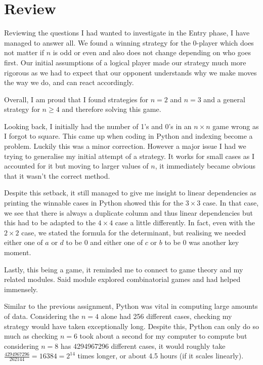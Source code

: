 \documentclass[11pt]{article}
\newcommand{\keywordfont}{\textsc}
\newcommand{\keyword}[1]{%
  \marginpar{\raggedright\small\keywordfont{#1}}}
\begin{document}
\section{Review}

Reviewing the \keyword{Check} questions I had wanted to investigate in the Entry phase, I have managed to answer all. We found a winning strategy for the 0-player which does not matter if $n$ is odd or even and also does not change depending on who goes first. Our initial assumptions of a logical player made our strategy much more rigorous as we had to expect that our opponent understands why we make moves the way we do, and can react accordingly. 

Overall, \keyword{Reflect} I am proud that I found strategies for $n=2$ and $n=3$ and a general strategy for $n \geq 4$ and therefore solving this game. 

Looking back, I initially  had the number of 1's and 0's in an $n \times n$ game wrong as I forgot to square. This came up when coding in Python and indexing become a problem. Luckily this was a minor correction. 
However a major issue I had we trying to generalise my initial attempt of a strategy. It works for small cases as I accounted for it but moving to larger values of $n$, it immediately became obvious that it wasn't the correct method. 

Despite this setback, it still managed to give me insight to linear dependencies as printing the winnable cases in Python showed this for the $3 \times 3$ case. In that case, we see that there is always a duplicate column and thus linear dependencies but this had to be adapted to the $4 \times 4$ case a little differently. In fact, even with the $2 \times 2$ case, we stated the formula for the determinant, but realising we needed either one of $a$ or $d$ to be 0 and either one of $c$ or $b$ to be 0 was another key moment. 

Lastly, this being a game, it reminded me to connect to game theory and my related modules. Said module explored combinatorial games and had helped immensely.

Similar to the previous assignment, Python \keyword{Reflect} was vital in computing large amounts of data. Considering the $n=4$ alone had 256 different cases, checking my strategy would have taken exceptionally long. Despite this, Python can only do so much as checking $n=6$ took about a second for my computer to compute but considering $n=8$ has 4294967296 different cases, it would roughly take $\frac{4294967296}{262144} = 16384 = 2^{14}$ times longer, or about 4.5 hours (if it scales linearly). 
\end{document}
